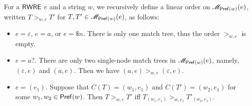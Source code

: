  \begin{definition}\label{def-regex-semantics}
  		
  	For a ${\sf RWRE}$ $e$ and a string $w$, we recursively define a linear order on $\mathscr{M}_{\mathsf{Pref}(w)}(e)$, written $T
  	>_{w,e} T'$ for $T, T' \in \mathscr{M}_{\mathsf{Pref}(w)}(e)$, as follows:
  	\begin{itemize}
  		\item $e = \varepsilon$, $e = a$, or $e = \$ n$. There is only one match tree, thus the
  		order $>_{w, e}$ is empty. 
 		\item $e  = a?$. There are only two single-node match trees in $\mathscr{M}_{\mathsf{Pref}(w)}(e)$, namely, $(\varepsilon, e)$ and $(a, e)$. Then we have $(a, e) >_{w,e} (\varepsilon, e)$. %
%		 		
  		\item $e = (e_1)$. Suppose that $C (T) = (w_1, e_1)$ and $C (T') = (w_2, e_1)$ for some $w_1, w_2 \in \mathsf{Pref}(w)$.
  		Then $T >_{w,e} T'$ iff $T_{(w_1, e_1)} >_{w, e_1} T'_{(w_2, e_1)}$.
  		

\end{itemize}
\end{definition}
